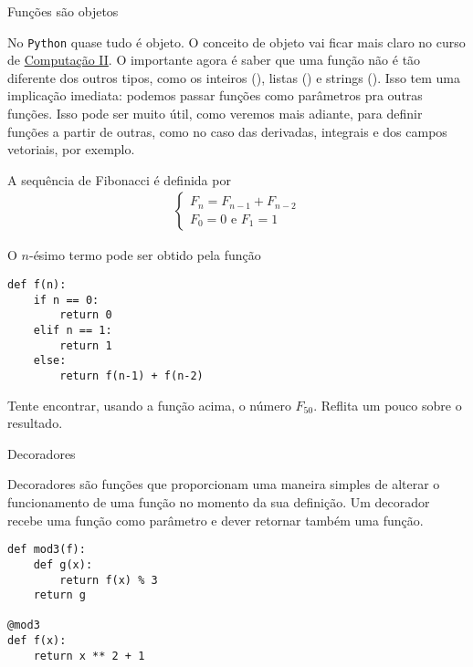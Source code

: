 \documentclass[12pt]{article}
\begin{document}
	
	
	\begin{interlude}{Funções são objetos}
	
	No \texttt{Python} quase tudo é objeto. O conceito de objeto vai ficar mais claro no curso de \href{https://github.com/pedromxavier/monitoria/raw/master/tex/comp2.pdf}{Computação II}. O importante agora é saber que uma função não é tão diferente dos outros tipos, como os inteiros (), listas () e strings (). Isso tem uma implicação imediata: podemos passar funções como parâmetros pra outras funções. Isso pode ser muito útil, como veremos mais adiante, para definir funções a partir de outras, como no caso das derivadas, integrais e dos campos vetoriais, por exemplo.
	
	\end{interlude}	
	
	
	A sequência de Fibonacci é definida por
	\begin{align*}
		\begin{cases}
		F_{n} = F_{n-1} + F_{n-2}\\
		F_{0} = 0 \text{ e } F_{1} = 1
		\end{cases}
	\end{align*}
	
	O $n$-ésimo termo pode ser obtido pela função

	\begin{lstlisting}[caption="Fibonacci"]
def f(n):
	if n == 0:
		return 0
	elif n == 1:
		return 1
	else:
		return f(n-1) + f(n-2)
	\end{lstlisting}
	
	\quest Tente encontrar, usando a função acima, o número $F_{50}$. Reflita um pouco sobre o resultado.
	
	\begin{interlude}{Decoradores}\label{i:decoradores}
	
	Decoradores são funções que proporcionam uma maneira simples de alterar o funcionamento de uma função no momento da sua definição. Um decorador recebe uma função como parâmetro e dever retornar também uma função.
	
	\begin{lstlisting}
def mod3(f):
	def g(x):
		return f(x) % 3
	return g
	
@mod3
def f(x):
	return x ** 2 + 1
	\end{lstlisting}	
	
	\end{interlude}
	
\end{document}

